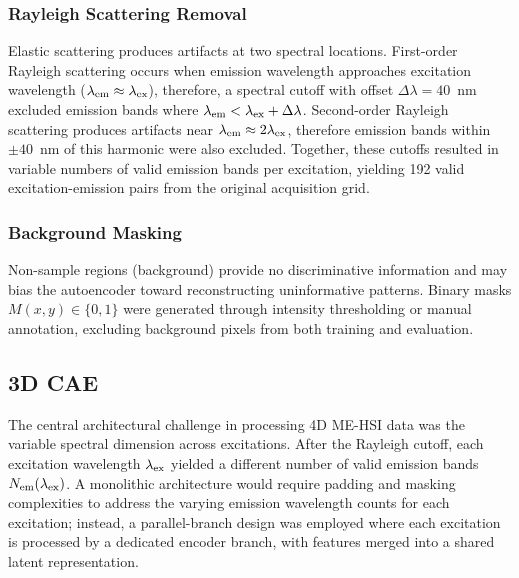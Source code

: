 \subsubsection{Rayleigh Scattering Removal}
Elastic scattering produces artifacts at two spectral locations.
First-order Rayleigh scattering occurs when emission wavelength approaches excitation wavelength ($\lambda_{\text{em}} \approx \lambda_{\text{ex}}$), therefore, a spectral cutoff with offset $\Delta\lambda = 40$\, nm excluded emission bands where $\lambda_{\text{em}} < \lambda_{\text{ex}} + \Delta\lambda$.
Second-order Rayleigh scattering produces artifacts near $\lambda_{\text{em}} \approx 2\lambda_{\text{ex}}$, therefore emission bands within $\pm 40$\, nm of this harmonic were also excluded.
Together, these cutoffs resulted in variable numbers of valid emission bands per excitation, yielding 192 valid excitation-emission pairs from the original acquisition grid.

\subsubsection{Background Masking}
Non-sample regions (background) provide no discriminative information and may bias the autoencoder toward reconstructing uninformative patterns.
Binary masks $M(x, y) \in \{0, 1\}$ were generated through intensity thresholding or manual annotation, excluding background pixels from both training and evaluation.

\subsection{3D CAE}
\label{sec:architecture}

The central architectural challenge in processing 4D ME-HSI data was the variable spectral dimension across excitations.
After the Rayleigh cutoff, each excitation wavelength $\lambda_{\text{ex}}$ yielded a different number of valid emission bands $N_{\text{em}}(\lambda_{\text{ex}})$.
A monolithic architecture would require padding and masking complexities to address the varying emission wavelength counts for each excitation; instead, a parallel-branch design was employed where each excitation is processed by a dedicated encoder branch, with features merged into a shared latent representation.


